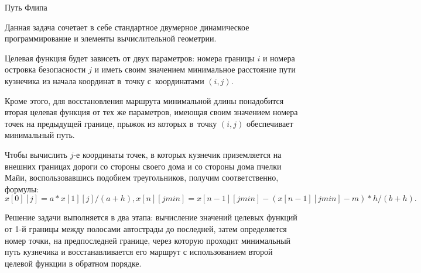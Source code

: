\begin{tutorial}{Путь Флипа}

Данная задача сочетает в себе стандартное двумерное динамическое программирование и элементы вычислительной геометрии.

Целевая функция будет зависеть от двух параметров: номера границы $i$ и номера островка безопасности $j$ и иметь своим значением минимальное расстояние пути кузнечика из начала координат в~точку с~координатами $(i, j)$.

Кроме этого, для восстановления маршрута минимальной длины понадобится вторая целевая функция от тех же параметров, имеющая своим значением номера точек на предыдущей границе, прыжок из которых в~точку $(i, j)$ обеспечивает минимальный путь.
 
Чтобы вычислить $j$-е координаты точек, в которых кузнечик приземляется на внешних границах дороги со стороны своего дома и со стороны дома пчелки Майи, воспользовавшись подобием треугольников, получим соответственно, формулы:
$$ 
x[0][j]=a*x[1][j]/(a+h), x[n][jmin]=x[n-1][jmin]-(x[n-1][jmin]-m)*h/(b+h).
$$

Решение задачи выполняется в два этапа: вычисление значений целевых функций от 1-й границы между полосами автострады до последней, затем определяется номер точки, на предпоследней границе, через которую проходит минимальный путь кузнечика и восстанавливается его маршрут с использованием второй целевой функции в обратном порядке. 


\end{tutorial}
